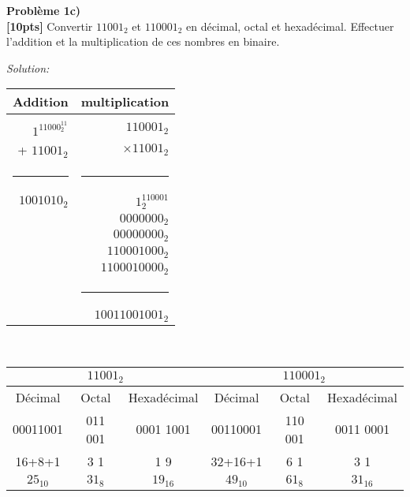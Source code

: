 \documentclass{article}
\newenvironment{problem}[2][Problème]
    { \begin{mdframed}[backgroundcolor=gray!20] \textbf{#1 #2} \\}
    {  \end{mdframed}}
\newenvironment{solution}
    {\textit{Solution:}}
    {}
\begin{document}
\begin{problem}{1c)}
\textbf{[10pts]} Convertir $11001_2$ et $110001_2$ en décimal, octal et hexadécimal. Effectuer l’addition et la multiplication de ces nombres en binaire.
\end{problem}
\begin{solution}
    \begin{tabular}{r|r}
        \large Addition & \large multiplication\\
        \hline \\ 
        \huge $1^11000^11_2$  & \huge $110001_2$\\
        + \huge $11001_2$       & \huge $\times 11001_2$\\
        \rule{1in}{2pt}         & \rule{1in}{2pt}\\
        \huge $1001010_2$       &  \Large $1^110001_2$\\
         & \Large $0000000_2$ \hspace{6pt}\\
         & \Large $00000000_2$ \hspace{8pt}\\
         & \Large $110001000_2$ \hspace{12pt}\\
         & \Large $1100010000_2$ \hspace{12pt}\\
         & \rule{1.2in}{2pt}\\
         & \Large $10011001001_2$
    \end{tabular}
    \\

    \begin{tabular}{|c|c|c|c|c|c|}
        \hline
        \multicolumn{3}{|c|}{\large $11001_2$} & \multicolumn{3}{|c|}{\large $110001_2$}\\
        \hline
        Décimal & Octal & Hexadécimal & Décimal & Octal & Hexadécimal\\
        \hline
        00011001 & 011 001 & 0001 1001 & 00110001 & 110 001 & 0011 0001\\
        16+8+1& 3\hspace{10pt} 1 & 1 \hspace{5pt}9 & 32+16+1 & 6\hspace{10pt} 1 & 3\hspace{5pt} 1\\
        $25_{10}$ & $31_8$ & $19_{16}$ & $49_{10}$ & $61_8$ & $31_{16}$\\
        \hline
    \end{tabular}
\end{solution}
\end{document}
